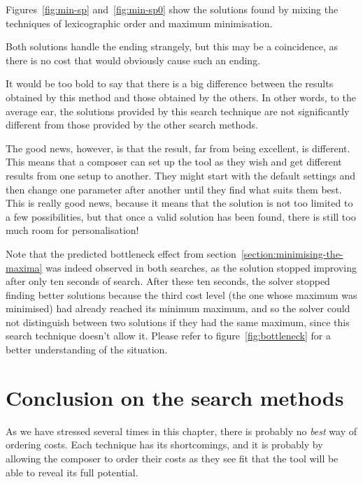 Figures~\ref{fig:min-sp} and~\ref{fig:min-sp0} show the solutions found by mixing the techniques of lexicographic order and maximum minimisation.

Both solutions handle the ending strangely, but this may be a coincidence, as there is no cost that would obviously cause such an ending.

It would be too bold to say that there is a big difference between the results obtained by this method and those obtained by the others. In other words, to the average ear, the solutions provided by this search technique are not significantly different from those provided by the other search methods.


The good news, however, is that the result, far from being excellent, is different. This means that a composer can set up the tool as they wish and get different results from one setup to another. They might start with the default settings and then change one parameter after another until they find what suits them best. This is really good news, because it means that the solution is not too limited to a few possibilities, but that once a valid solution has been found, there is still too much room for personalisation!


Note that the predicted bottleneck effect from section~\ref{section:minimising-the-maxima} was indeed observed in both searches, as the solution stopped improving after only ten seconds of search. After these ten seconds, the solver stopped finding better solutions because the third cost level (the one whose maximum was minimised) had already reached its minimum maximum, and so the solver could not distinguish between two solutions if they had the same maximum, since this search technique doesn't allow it. Please refer to figure~\ref{fig:bottleneck} for a better understanding of the situation.


\section{Conclusion on the search methods}
As we have stressed several times in this chapter, there is probably no \textit{best} way of ordering costs. Each technique has its shortcomings, and it is probably by allowing the composer to order their costs as they see fit that the tool will be able to reveal its full potential. 


